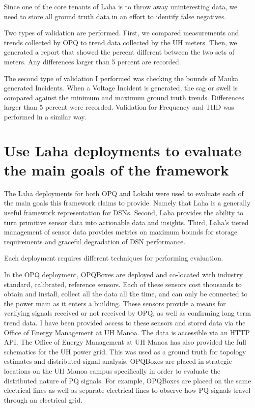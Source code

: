 Since one of the core tenants of Laha is to throw away uninteresting data, we need to store all ground truth data in an effort to identify false negatives.

Two types of validation are performed. First, we compared measurements and trends collected by OPQ to trend data collected by the UH meters. Then, we generated a report that showed the percent different between the two sets of meters. Any differences larger than 5 percent are recorded.

The second type of validation I performed was checking the bounds of Mauka generated Incidents. When a Voltage Incident is generated, the sag or swell is compared against the minimum and maximum ground truth trends. Differences larger than 5 percent were recorded. Validation for Frequency and THD was performed in a similar way.

\section{Use Laha deployments to evaluate the main goals of the framework}\label{sec:use-laha-deployments-to-evaluate-the-main-goals-of-the-framework}
The Laha deployments for both OPQ and Lokahi were used to evaluate each of the main goals this framework claims to provide. Namely that Laha is a generally useful framework representation for DSNs. Second, Laha provides the ability to turn primitive sensor data into actionable data and insights. Third, Laha's tiered management of sensor data provides metrics on maximum bounds for storage requirements and graceful degradation of DSN performance.

Each deployment requires different techniques for performing evaluation.

In the OPQ deployment, OPQBoxes are deployed and co-located with industry standard, calibrated, reference sensors. Each of these sensors cost thousands to obtain and install, collect all the data all the time, and can only be connected to the power main as it enters a building. These sensors provide a means for verifying signals received or not received by OPQ, as well as confirming long term trend data. I have been provided access to these sensors and stored data via the Office of Energy Management at UH Manoa. The data is accessible via an HTTP API. The Office of Energy Management at UH Manoa has also provided the full schematics for the UH power grid. This was used as a ground truth for topology estimates and distributed signal analysis. OPQBoxes are placed in strategic locations on the UH Manoa campus specifically in order to evaluate the distributed nature of PQ signals. For example, OPQBoxes are placed on the same electrical lines as well as separate electrical lines to observe how PQ signals travel through an electrical grid.


